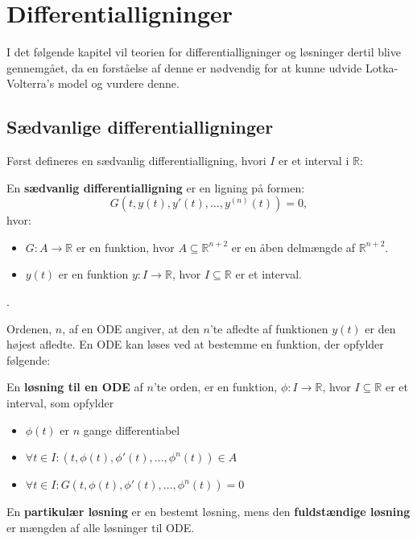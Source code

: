 \chapter{Differentialligninger}
I det følgende kapitel vil teorien for differentialligninger og løsninger dertil blive gennemgået, da en forståelse af denne er nødvendig for at kunne udvide Lotka-Volterra's model og vurdere denne. 

\section{Sædvanlige differentialligninger}
Først defineres en sædvanlig differentialligning, hvori $I$ er et interval i $\mathbb{R}$:
\begin{definition}\label{LoesningODE}
En \textbf{sædvanlig differentialligning} er en ligning på formen: \hfill \break
$$G(t,y(t),y'(t), \hdots , y^{(n)}(t))=0,$$
hvor:
\begin{itemize}
    \item $G:A \to \mathbb{R}$ er en funktion, hvor $A \subseteq \mathbb{R}^{n+2}$ er en åben delmængde af $\mathbb{R}^{n+2}$.
    \item $y(t)$ er en funktion $y\colon I\to \mathbb{R}$, hvor $I\subseteq \mathbb{R}$ er et interval.
\end{itemize}.
\end{definition}

Ordenen, $n$, af en ODE angiver, at den $n$'te afledte af funktionen $y(t)$ er den højest afledte. 
En ODE kan løses ved at bestemme en funktion, der opfylder følgende:

\begin{definition} 
En \textbf{løsning til en ODE} af $n$'te orden, er en funktion, $\phi: I\to \mathbb{R}$, hvor $I\subseteq \mathbb{R}$ er et interval, som opfylder
\begin{itemize}
    \item $\phi(t)$ er $n$ gange differentiabel
    \item $\forall t\in I: (t,\phi(t),\phi'(t),\hdots,\phi^n(t))\in A$
    \item $\forall t\in I: G(t, \phi(t),\phi'(t),\hdots,\phi^n(t))=0$
\end{itemize}

En \textbf{partikulær løsning} er en bestemt løsning, mens den \textbf{fuldstændige løsning} er mængden af alle løsninger til ODE.
\end{definition}

